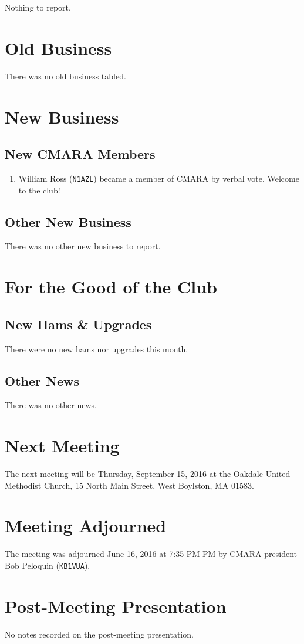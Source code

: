 \documentclass[10pt,letterpaper]{article}
\begin{document}
Nothing to report.

\section{Old Business}

There was no old business tabled.

\section{New Business}

\subsection{New CMARA Members}

\begin{enumerate}
\item William Ross (\texttt{N1AZL}) became a member of CMARA by verbal vote. Welcome to the club!
\end{enumerate}

\subsection{Other New Business}

There was no other new business to report.

\section{For the Good of the Club}

\subsection{New Hams \& Upgrades}

There were no new hams nor upgrades this month.

\subsection{Other News}

There was no other news.

\section{Next Meeting}

The next meeting will be Thursday, September 15, 2016 at the Oakdale United Methodist Church, 15 North Main Street, West Boylston, MA 01583.\\

\section{Meeting Adjourned}
The meeting was adjourned June 16, 2016 at 7:35 PM PM by CMARA president Bob Peloquin (\texttt{KB1VUA}).

\section{Post-Meeting Presentation}

No notes recorded on the post-meeting presentation.
\end{document}
